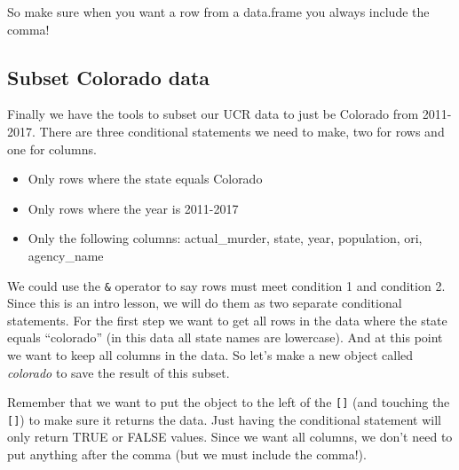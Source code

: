 \documentclass[
  12pt,
]{book}
\newenvironment{Shaded}{\begin{snugshade}}{\end{snugshade}}
\newcommand{\CommentTok}[1]{\textcolor[rgb]{0.37,0.37,0.37}{\textit{#1}}}
\newcommand{\DecValTok}[1]{\textcolor[rgb]{0.06,0.06,0.06}{#1}}
\newcommand{\NormalTok}[1]{#1}
\newcommand{\OperatorTok}[1]{\textcolor[rgb]{0.43,0.43,0.43}{\textbf{#1}}}
\newcommand{\StringTok}[1]{\textcolor[rgb]{0.5,0.5,0.5}{#1}}
\providecommand{\tightlist}{%
  \setlength{\itemsep}{0pt}\setlength{\parskip}{0pt}}
\begin{document}
\begin{Shaded}
\end{Shaded}

So make sure when you want a row from a data.frame you always include the comma!

\hypertarget{subset-colorado-data}{%
\subsection{Subset Colorado data}\label{subset-colorado-data}}

Finally we have the tools to subset our UCR data to just be Colorado from 2011-2017. There are three conditional statements we need to make, two for rows and one for columns.

\begin{itemize}
\tightlist
\item
  Only rows where the state equals Colorado
\item
  Only rows where the year is 2011-2017
\item
  Only the following columns: actual\_murder, state, year, population, ori, agency\_name
\end{itemize}

We could use the \texttt{\&} operator to say rows must meet condition 1 and condition 2. Since this is an intro lesson, we will do them as two separate conditional statements. For the first step we want to get all rows in the data where the state equals ``colorado'' (in this data all state names are lowercase). And at this point we want to keep all columns in the data. So let's make a new object called \emph{colorado} to save the result of this subset.

Remember that we want to put the object to the left of the \texttt{{[}{]}} (and touching the \texttt{{[}{]}}) to make sure it returns the data. Just having the conditional statement will only return TRUE or FALSE values. Since we want all columns, we don't need to put anything after the comma (but we must include the comma!).

\begin{Shaded}
\end{Shaded}
\end{document}
